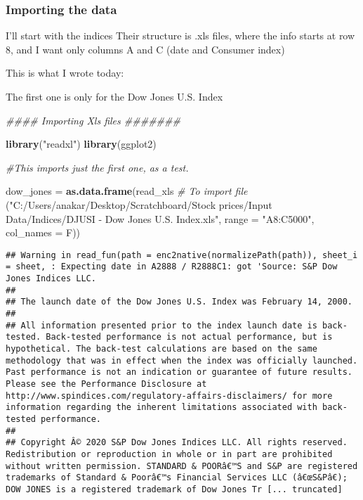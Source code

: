 \documentclass[
]{article}
\newenvironment{Shaded}{\begin{snugshade}}{\end{snugshade}}
\newcommand{\CommentTok}[1]{\textcolor[rgb]{0.56,0.35,0.01}{\textit{#1}}}
\newcommand{\DataTypeTok}[1]{\textcolor[rgb]{0.13,0.29,0.53}{#1}}
\newcommand{\KeywordTok}[1]{\textcolor[rgb]{0.13,0.29,0.53}{\textbf{#1}}}
\newcommand{\NormalTok}[1]{#1}
\newcommand{\StringTok}[1]{\textcolor[rgb]{0.31,0.60,0.02}{#1}}
\begin{document}
\hypertarget{importing-the-data}{%
\subsubsection{Importing the data}\label{importing-the-data}}

I'll start with the indices Their structure is .xls files, where the
info starts at row 8, and I want only columns A and C (date and Consumer
index)

This is what I wrote today:

The first one is only for the Dow Jones U.S. Index

\begin{Shaded}
\begin{Highlighting}[]
\CommentTok{#### Importing Xls files #######}

\KeywordTok{library}\NormalTok{(}\StringTok{"readxl"}\NormalTok{)}
\KeywordTok{library}\NormalTok{(ggplot2)}

\CommentTok{#This imports just the first one, as a test.}

\NormalTok{dow_jones =}\StringTok{ }\KeywordTok{as.data.frame}\NormalTok{(read_xls    }\CommentTok{# To import file}
\NormalTok{                          (}\StringTok{"C:/Users/anakar/Desktop/Scratchboard/Stock prices/Input Data/Indices/DJUSI - Dow Jones U.S. Index.xls"}\NormalTok{,}
                            \DataTypeTok{range =} \StringTok{"A8:C5000"}\NormalTok{, }\DataTypeTok{col_names =}\NormalTok{ F))}
\end{Highlighting}
\end{Shaded}

\begin{verbatim}
## Warning in read_fun(path = enc2native(normalizePath(path)), sheet_i = sheet, : Expecting date in A2888 / R2888C1: got 'Source: S&P Dow Jones Indices LLC.
## 
## The launch date of the Dow Jones U.S. Index was February 14, 2000.
## 
## All information presented prior to the index launch date is back-tested. Back-tested performance is not actual performance, but is hypothetical. The back-test calculations are based on the same methodology that was in effect when the index was officially launched. Past performance is not an indication or guarantee of future results.  Please see the Performance Disclosure at http://www.spindices.com/regulatory-affairs-disclaimers/ for more information regarding the inherent limitations associated with back-tested performance.
## 
## Copyright Â© 2020 S&P Dow Jones Indices LLC. All rights reserved. Redistribution or reproduction in whole or in part are prohibited without written permission. STANDARD & POORâ€™S and S&P are registered trademarks of Standard & Poorâ€™s Financial Services LLC (â€œS&Pâ€); DOW JONES is a registered trademark of Dow Jones Tr [... truncated]
\end{verbatim}
\end{document}
